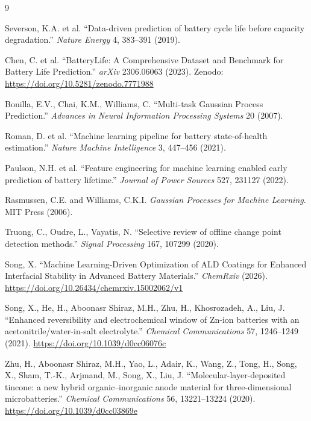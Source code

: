 \documentclass[12pt]{article}
\begin{document}

\begin{thebibliography}{9}

Severson, K.A. et al.
``Data-driven prediction of battery cycle life before capacity degradation.''
\textit{Nature Energy} 4, 383--391 (2019).

Chen, C. et al.
``BatteryLife: A Comprehensive Dataset and Benchmark for Battery Life Prediction.''
\textit{arXiv} 2306.06063 (2023).
Zenodo: \url{https://doi.org/10.5281/zenodo.7771988}

Bonilla, E.V., Chai, K.M., Williams, C.
``Multi-task Gaussian Process Prediction.''
\textit{Advances in Neural Information Processing Systems} 20 (2007).

Roman, D. et al.
``Machine learning pipeline for battery state-of-health estimation.''
\textit{Nature Machine Intelligence} 3, 447--456 (2021).

Paulson, N.H. et al.
``Feature engineering for machine learning enabled early prediction of battery
lifetime.''
\textit{Journal of Power Sources} 527, 231127 (2022).

Rasmussen, C.E. and Williams, C.K.I.
\textit{Gaussian Processes for Machine Learning}.
MIT Press (2006).

Truong, C., Oudre, L., Vayatis, N.
``Selective review of offline change point detection methods.''
\textit{Signal Processing} 167, 107299 (2020).

Song, X.
``Machine Learning-Driven Optimization of ALD Coatings for Enhanced Interfacial Stability in Advanced Battery Materials.''
\textit{ChemRxiv} (2026).
\url{https://doi.org/10.26434/chemrxiv.15002062/v1}

Song, X., He, H., Aboonasr Shiraz, M.H., Zhu, H., Khosrozadeh, A., Liu, J.
``Enhanced reversibility and electrochemical window of Zn-ion batteries
with an acetonitrile/water-in-salt electrolyte.''
\textit{Chemical Communications} 57, 1246--1249 (2021).
\url{https://doi.org/10.1039/d0cc06076c}

Zhu, H., Aboonasr Shiraz, M.H., Yao, L., Adair, K., Wang, Z., Tong, H.,
Song, X., Sham, T.-K., Arjmand, M., Song, X., Liu, J.
``Molecular-layer-deposited tincone: a new hybrid organic--inorganic anode
material for three-dimensional microbatteries.''
\textit{Chemical Communications} 56, 13221--13224 (2020).
\url{https://doi.org/10.1039/d0cc03869e}


\end{thebibliography}
\end{document}
